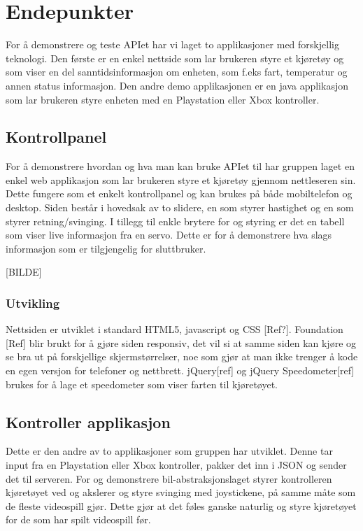 \documentclass[12pt]{report}
\begin{document}
\chapter{Endepunkter}
For å demonstrere og teste APIet har vi laget to applikasjoner med forskjellig teknologi.
Den første er en enkel nettside som lar brukeren styre et kjøretøy og som viser en del sanntidsinformasjon om enheten, som f.eks fart, temperatur og annen status informasjon. Den andre demo applikasjonen er en java applikasjon som lar brukeren styre enheten med en Playstation eller Xbox kontroller.

\section{Kontrollpanel}
For å demonstrere hvordan og hva man kan bruke APIet til har gruppen laget en enkel web applikasjon som lar brukeren styre et kjøretøy gjennom nettleseren sin. Dette fungere som et enkelt kontrollpanel og kan brukes på både mobiltelefon og desktop. Siden består i hovedsak av to slidere, en som styrer hastighet og en som styrer retning/svinging. I tillegg til enkle brytere for og styring er det en tabell som viser live informasjon fra en servo. Dette er for å demonstrere hva slags informasjon som er tilgjengelig for sluttbruker.

[BILDE]

\subsection{Utvikling}
Nettsiden er utviklet i standard HTML5, javascript og CSS [Ref?]. Foundation [Ref] blir brukt for å gjøre siden responsiv, det vil si at samme siden kan kjøre og se bra ut på forskjellige skjermstørrelser, noe som gjør at man ikke trenger å kode en egen versjon for telefoner og nettbrett. jQuery[ref] og jQuery Speedometer[ref] brukes for å lage et speedometer som viser farten til kjøretøyet.

\section{Kontroller applikasjon}
Dette er den andre av to applikasjoner som gruppen har utviklet. Denne tar input fra en Playstation eller Xbox kontroller, pakker det inn i JSON og sender det til serveren. For og demonstrere bil-abstraksjonslaget styrer kontrolleren kjøretøyet ved og akslerer og styre svinging med joystickene, på samme måte som de fleste videospill gjør. Dette gjør at det føles ganske naturlig og styre kjøretøyet for de som har spilt videospill før.
\end{document}

